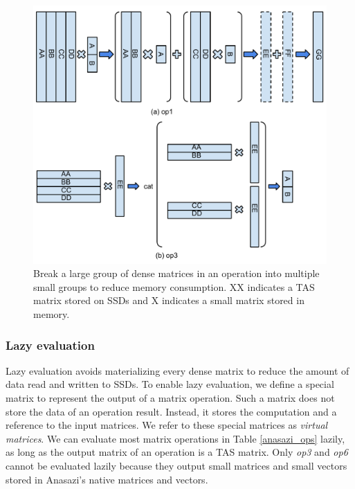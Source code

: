 \begin{figure}
\centering
\includegraphics[scale=0.4]{./mat_group.pdf}
\vspace{-5pt}
\caption{Break a large group of dense matrices in an operation into multiple
small groups to reduce memory consumption. XX indicates a TAS matrix
stored on SSDs and X indicates a small matrix stored in memory.}
\vspace{-5pt}
\label{fig:mat_group}
\end{figure}

\subsubsection{Lazy evaluation} \label{sec:lazy_eval}
Lazy evaluation avoids materializing every dense matrix to reduce the amount
of data read and written to SSDs.
To enable lazy evaluation, we define a special matrix to represent the output
of a matrix operation. Such a matrix does not store the data of
an operation result. Instead, it stores the computation and a reference to
the input matrices. We refer to these special matrices as \textit{virtual matrices}.
We can evaluate most matrix operations in Table \ref{anasazi_ops} lazily,
as long as the output matrix of an operation is a TAS matrix. Only \textit{op3}
and \textit{op6} cannot be evaluated lazily because they output small matrices
and small vectors stored in Anasazi's native matrices and vectors.


